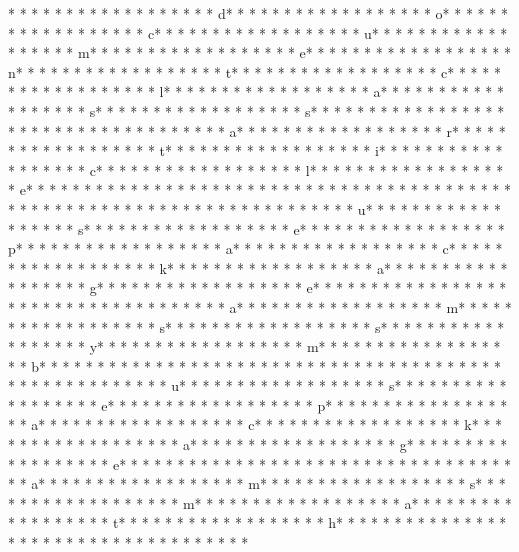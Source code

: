 * * *  * * *  * * *  *  * * *  *  * * *  * d* * *  * * *  * * *  *  * * *  *  * * *  * o* * *  * * *  * * *  *  * * *  *  * * *  * c* * *  * * *  * * *  *  * * *  *  * * *  * u* * *  * * *  * * *  *  * * *  *  * * *  * m* * *  * * *  * * *  *  * * *  *  * * *  * e* * *  * * *  * * *  *  * * *  *  * * *  * n* * *  * * *  * * *  *  * * *  *  * * *  * t* * *  * * *  * * *  *  * * *  *  * * *  * c* * *  * * *  * * *  *  * * *  *  * * *  * l* * *  * * *  * * *  *  * * *  *  * * *  * a* * *  * * *  * * *  *  * * *  *  * * *  * s* * *  * * *  * * *  *  * * *  *  * * *  * s* * *  * * *  * * *  *  * * *  *  * * *  * {* * *  * * *  * * *  *  * * *  *  * * *  * a* * *  * * *  * * *  *  * * *  *  * * *  * r* * *  * * *  * * *  *  * * *  *  * * *  * t* * *  * * *  * * *  *  * * *  *  * * *  * i* * *  * * *  * * *  *  * * *  *  * * *  * c* * *  * * *  * * *  *  * * *  *  * * *  * l* * *  * * *  * * *  *  * * *  *  * * *  * e* * *  * * *  * * *  *  * * *  *  * * *  * }* * *  * * *  * * *  *  * * *  *  * * *  * 
* * *  * * *  * * *  *  * * *  *  * * *  * 
* * *  * * *  * * *  *  * * *  *  * * *  * u* * *  * * *  * * *  *  * * *  *  * * *  * s* * *  * * *  * * *  *  * * *  *  * * *  * e* * *  * * *  * * *  *  * * *  *  * * *  * p* * *  * * *  * * *  *  * * *  *  * * *  * a* * *  * * *  * * *  *  * * *  *  * * *  * c* * *  * * *  * * *  *  * * *  *  * * *  * k* * *  * * *  * * *  *  * * *  *  * * *  * a* * *  * * *  * * *  *  * * *  *  * * *  * g* * *  * * *  * * *  *  * * *  *  * * *  * e* * *  * * *  * * *  *  * * *  *  * * *  * {* * *  * * *  * * *  *  * * *  *  * * *  * a* * *  * * *  * * *  *  * * *  *  * * *  * m* * *  * * *  * * *  *  * * *  *  * * *  * s* * *  * * *  * * *  *  * * *  *  * * *  * s* * *  * * *  * * *  *  * * *  *  * * *  * y* * *  * * *  * * *  *  * * *  *  * * *  * m* * *  * * *  * * *  *  * * *  *  * * *  * b* * *  * * *  * * *  *  * * *  *  * * *  * }* * *  * * *  * * *  *  * * *  *  * * *  * 
* * *  * * *  * * *  *  * * *  *  * * *  * u* * *  * * *  * * *  *  * * *  *  * * *  * s* * *  * * *  * * *  *  * * *  *  * * *  * e* * *  * * *  * * *  *  * * *  *  * * *  * p* * *  * * *  * * *  *  * * *  *  * * *  * a* * *  * * *  * * *  *  * * *  *  * * *  * c* * *  * * *  * * *  *  * * *  *  * * *  * k* * *  * * *  * * *  *  * * *  *  * * *  * a* * *  * * *  * * *  *  * * *  *  * * *  * g* * *  * * *  * * *  *  * * *  *  * * *  * e* * *  * * *  * * *  *  * * *  *  * * *  * {* * *  * * *  * * *  *  * * *  *  * * *  * a* * *  * * *  * * *  *  * * *  *  * * *  * m* * *  * * *  * * *  *  * * *  *  * * *  * s* * *  * * *  * * *  *  * * *  *  * * *  * m* * *  * * *  * * *  *  * * *  *  * * *  * a* * *  * * *  * * *  *  * * *  *  * * *  * t* * *  * * *  * * *  *  * * *  *  * * *  * h* * *  * * *  * * *  *  * * *  *  * * *  * }* * *  * * *  * * *  *  * * *  *  * * *  * 
